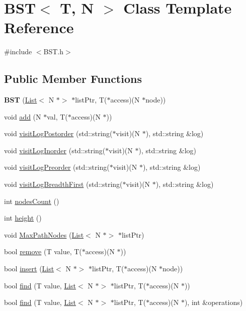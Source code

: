 \hypertarget{class_b_s_t}{}\section{B\+ST$<$ T, N $>$ Class Template Reference}
\label{class_b_s_t}


{\ttfamily \#include $<$B\+S\+T.\+h$>$}

\subsection*{Public Member Functions}
\begin{DoxyCompactItemize}
\item 
\mbox{\label{class_b_s_t_a926396322f01395ffccb4eeb6365fc44}} 
{\bfseries B\+ST} (\hyperlink{class_list}{List}$<$ N $\ast$$>$ $\ast$list\+Ptr, T($\ast$access)(N $\ast$node))
\item 
void \hyperlink{class_b_s_t_afc990532c54fba36b8501836b1834ac6}{add} (N $\ast$val, T($\ast$access)(N $\ast$))
\item 
void \hyperlink{class_b_s_t_a831b6fdcda13b7a353e03992b9c965b7}{visit\+Log\+Postorder} (std\+::string($\ast$visit)(N $\ast$), std\+::string \&log)
\item 
void \hyperlink{class_b_s_t_a04d669d91c9528c61f618d022999ea26}{visit\+Log\+Inorder} (std\+::string($\ast$visit)(N $\ast$), std\+::string \&log)
\item 
void \hyperlink{class_b_s_t_a7ed3924d6f70e52c7a6bc1d5bddbb31d}{visit\+Log\+Preorder} (std\+::string($\ast$visit)(N $\ast$), std\+::string \&log)
\item 
void \hyperlink{class_b_s_t_a3e958de8a85c1268b11006a3ed32a7bb}{visit\+Log\+Breadth\+First} (std\+::string($\ast$visit)(N $\ast$), std\+::string \&log)
\item 
int \hyperlink{class_b_s_t_a86fb81e20a21ef65e2b57e55d910d875}{nodes\+Count} ()
\item 
int \hyperlink{class_b_s_t_a84bfd35b9fdf74574ffcac8b33a129b3}{height} ()
\item 
void \hyperlink{class_b_s_t_a757799b702dc9729c0b7e63b63b91647}{Max\+Path\+Nodes} (\hyperlink{class_list}{List}$<$ N $\ast$$>$ $\ast$list\+Ptr)
\item 
bool \hyperlink{class_b_s_t_aef5667b555733710dbe17aa7218e248d}{remove} (T value, T($\ast$access)(N $\ast$))
\item 
bool \hyperlink{class_b_s_t_ace5f293fc8c1816f257afc1c26334e51}{insert} (\hyperlink{class_list}{List}$<$ N $\ast$$>$ $\ast$list\+Ptr, T($\ast$access)(N $\ast$node))
\item 
bool \hyperlink{class_b_s_t_a5b31797d590b06f6ed2c68fc6161510b}{find} (T value, \hyperlink{class_list}{List}$<$ N $\ast$$>$ $\ast$list\+Ptr, T($\ast$access)(N $\ast$))
\item 
bool \hyperlink{class_b_s_t_a2ddd955621922fcbb75dc2920d4a479b}{find} (T value, \hyperlink{class_list}{List}$<$ N $\ast$$>$ $\ast$list\+Ptr, T($\ast$access)(N $\ast$), int \&operations)
\end{DoxyCompactItemize}


